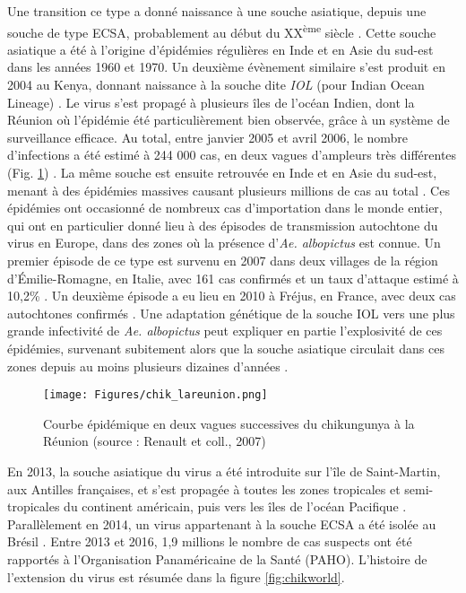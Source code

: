 Une transition ce type a donné naissance à une souche asiatique, depuis une souche de type ECSA, probablement au début du XX\textsuperscript{ème} siècle \cite{volk2010genome}.
Cette souche asiatique a été à l'origine d'épidémies régulières en Inde et en Asie du sud-est dans les années 1960 et 1970.
Un deuxième évènement similaire s'est produit en 2004 au Kenya, donnant naissance à la souche dite \textit{IOL} (pour \guillemotleft Indian Ocean Lineage\guillemotright) \cite{chretien2007drought}. 
Le virus s'est propagé à plusieurs îles de l'océan Indien, dont la Réunion où l'épidémie été particulièrement bien observée, grâce à un système de surveillance efficace.
Au total, entre janvier 2005 et avril 2006, le nombre d'infections a été estimé à 244 000 cas, en deux vagues d'ampleurs très différentes (Fig. \ref{fig:chiklareuion}) \cite{renault2007major}.
La même souche est ensuite retrouvée en Inde et en Asie du sud-est, menant à des épidémies massives causant plusieurs millions de cas au total \cite{arankalle2007genetic}.
Ces épidémies ont occasionné de nombreux cas d'importation dans le monde entier, qui ont en particulier donné lieu à des épisodes de transmission autochtone du virus en Europe, dans des zones où la présence d'{\em Ae. albopictus} est connue.
Un premier épisode de ce type est survenu en 2007 dans deux villages de la région d'\'Emilie-Romagne, en Italie, avec 161 cas confirmés et un taux d'attaque estimé à 10,2\% \cite{poletti2011transmission}.
Un deuxième épisode a eu lieu en 2010 à Fréjus, en France, avec deux cas autochtones confirmés \cite{grandadam2011chikungunya}.
Une adaptation génétique de la souche IOL vers une plus grande infectivité de {\em Ae. albopictus} peut expliquer en partie l'explosivité de ces épidémies, survenant subitement alors que la souche asiatique circulait dans ces zones depuis au moins plusieurs dizaines d'années \cite{arankalle2007genetic,tsetsarkin2007single,tsetsarkin2011chikungunya}.
\begin{figure}[t]
	\centering
	\texttt{[image: Figures/chik\_lareunion.png]}
	\caption{Courbe épidémique en deux vagues successives du chikungunya à la Réunion (source : Renault et coll., 2007)}
	\label{fig:chiklareuion}
\end{figure}

En 2013, la souche asiatique du virus a été introduite sur l'île de Saint-Martin, aux Antilles françaises, et s'est propagée à toutes les zones tropicales et semi-tropicales du continent américain, puis vers les îles de l'océan Pacifique \cite{leparc2014chikungunya}.
Parallèlement en 2014, un virus appartenant à la souche ECSA a été isolée au Brésil \cite{nunes2015emergence}.
Entre 2013 et 2016, 1,9 millions le nombre de cas suspects ont été rapportés à l'Organisation Panaméricaine de la Santé (PAHO).
L'histoire de l'extension du virus est résumée dans la figure \ref{fig:chikworld}.


